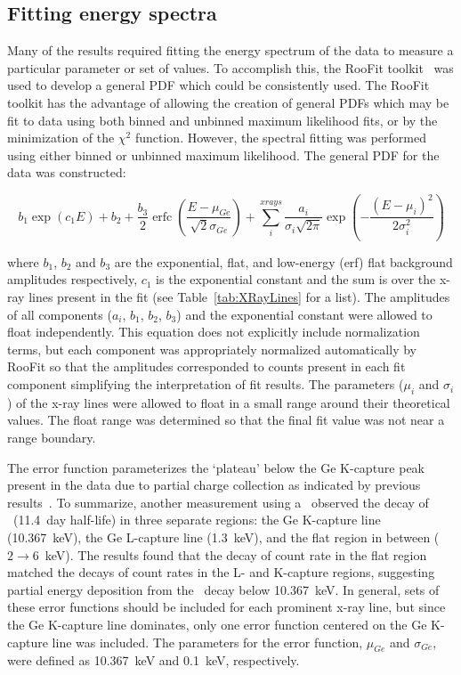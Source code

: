 		\subsection{Fitting energy spectra}
		\label{sec:BeGeSpecFit}	

	Many of the results required fitting the energy spectrum of the data to measure a particular parameter or set of values.  To accomplish this, the RooFit toolkit~\cite{ver03aa} was used to develop a general PDF which could be consistently used.  The RooFit toolkit has the advantage of allowing the creation of general PDFs which may be fit to data using both binned and unbinned maximum likelihood fits, or by the minimization of the $\chi^{2}$ function.  However, the spectral fitting was performed using either binned or unbinned maximum likelihood.  The general PDF for the data was constructed:
	
			\begin{equation}
				b_{1} \exp\left(c_{1} E\right) + b_{2} + \frac{b_{3}}{2}\operatorname{erfc}\left( \frac{E - \mu_{Ge}}{\sqrt{2} \sigma_{Ge}}\right) + 
					\sum^{xrays}_{i} \frac{a_{i}}{\sigma_{i}\sqrt{2 \pi}} 
					\exp\left(-\frac{(E - \mu_{i})^{2}}{2 \sigma_{i}^{2}}\right)
				\label{eqn:InitialFitEqn}
			\end{equation}

where $b_{1}$, $b_{2}$ and $b_{3}$ are the exponential, flat, and low-energy (erf) flat background amplitudes respectively, $c_{1}$ is the exponential constant and the sum is over the x-ray lines present in the fit (see Table~\ref{tab:XRayLines} for a list).  The amplitudes of all components ($a_{i}$, $b_{1}$, $b_{2}$, $b_{3}$) and the exponential constant were allowed to float independently.  This equation does not explicitly include normalization terms, but each component was appropriately normalized automatically by RooFit so that the amplitudes corresponded to counts present in each fit component simplifying the interpretation of fit results.  The parameters ($\mu_{i}$ and $\sigma_{i}$) of the x-ray lines were allowed to float in a small range around their theoretical values.  The float range was determined so that the final fit value was not near a range boundary.

The error function parameterizes the `plateau' below the Ge K-capture peak present in the data due to partial charge collection as indicated by previous results~\cite{Barbeau:2009fk}.  To summarize, another measurement using a \ppc~observed the decay of \gersevenone~(11.4~day half-life) in three separate regions: the Ge K-capture line (10.367~keV), the Ge L-capture line (1.3~keV), and the flat region in between ($2\to6$~keV).  The results found that the decay of count rate in the flat region matched the decays of count rates in the L- and K-capture regions, suggesting partial energy deposition from the \gersevenone~decay below 10.367~keV.  In general, sets of these error functions should be included for each prominent x-ray line, but since the Ge K-capture line dominates, only one error function centered on the Ge K-capture line was included.  The parameters for the error function, $\mu_{Ge}$ and $\sigma_{Ge}$, were defined as 10.367~keV and 0.1~keV, respectively.  

